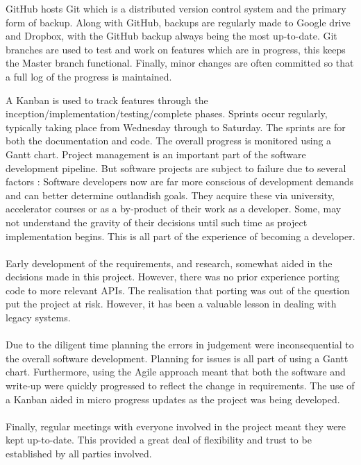   GitHub hosts Git which is a distributed version control system and the primary form of backup. Along with GitHub, backups are regularly made to Google drive and Dropbox, with the GitHub backup always being the most up-to-date. Git branches are used to test and work on features which are in progress, this keeps the Master branch functional. Finally, minor changes are often committed so that a full log of the progress is maintained.

  A Kanban is used to track features through the inception/implementation/testing/complete phases. Sprints occur regularly, typically taking place from Wednesday through to Saturday. The sprints are for both the documentation and code. The overall progress is monitored using a Gantt chart.
  Project management is an important part of the software development pipeline. But software projects are subject to failure due to several factors \cite{software_failure}:
%
  Software developers now are far more conscious of development demands and can better determine outlandish goals. They acquire these via university, accelerator courses or as a by-product of their work as a developer. Some, may not understand the gravity of their decisions until such time as project implementation begins. This is all part of the experience of becoming a developer.\\\\
  Early development of the requirements, and research, somewhat aided in the decisions made in this project. However, there was no prior experience porting code to more relevant APIs. The realisation that porting was out of the question put the project at risk. However, it has been a valuable lesson in dealing with legacy systems.\\\\
  Due to the diligent time planning the errors in judgement were inconsequential to the overall software development. Planning for issues is all part of using a Gantt chart. Furthermore, using the Agile approach meant that both the software and write-up were quickly progressed to reflect the change in requirements. The use of a Kanban aided in micro progress updates as the project was being developed.\\\\
  Finally, regular meetings with everyone involved in the project meant they were kept up-to-date. This provided a great deal of flexibility and trust to be established by all parties involved.

